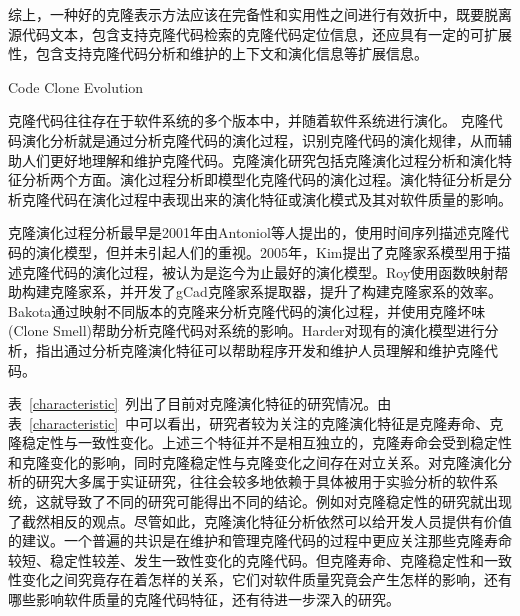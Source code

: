 综上，一种好的克隆表示方法应该在完备性和实用性之间进行有效折中，既要脱离源代码文本，包含支持克隆代码检索的克隆代码定位信息，还应具有一定的可扩展性，包含支持克隆代码分析和维护的上下文和演化信息等扩展信息。

{Code Clone Evolution}
\label{ref-evolution}

克隆代码往往存在于软件系统的多个版本中，并随着软件系统进行演化。
克隆代码演化分析就是通过分析克隆代码的演化过程，识别克隆代码的演化规律，从而辅助人们更好地理解和维护克隆代码。克隆演化研究包括克隆演化过程分析和演化特征分析两个方面。演化过程分析即模型化克隆代码的演化过程。演化特征分析是分析克隆代码在演化过程中表现出来的演化特征或演化模式及其对软件质量的影响。

克隆演化过程分析最早是2001年由Antoniol等人提出的，使用时间序列描述克隆代码的演化模型\cite{antoniol2001modeling}，但并未引起人们的重视。2005年，Kim提出了克隆家系模型用于描述克隆代码的演化过程，被认为是迄今为止最好的演化模型\cite{kim2005empirical}。Roy使用函数映射帮助构建克隆家系，并开发了gCad克隆家系提取器，提升了构建克隆家系的效率\cite{saha2011automatic}。Bakota通过映射不同版本的克隆来分析克隆代码的演化过程，并使用克隆坏味(Clone Smell)帮助分析克隆代码对系统的影响\cite{bakota2011tracking}。Harder对现有的演化模型进行分析\cite{harder2009modeling}，指出通过分析克隆演化特征可以帮助程序开发和维护人员理解和维护克隆代码。

表~\ref{characteristic}~列出了目前对克隆演化特征的研究情况。由表~\ref{characteristic}~中可以看出，研究者较为关注的克隆演化特征是克隆寿命、克隆稳定性与一致性变化。上述三个特征并不是相互独立的，克隆寿命会受到稳定性和克隆变化的影响，同时克隆稳定性与克隆变化之间存在对立关系。对克隆演化分析的研究大多属于实证研究，往往会较多地依赖于具体被用于实验分析的软件系统，这就导致了不同的研究可能得出不同的结论。例如对克隆稳定性的研究就出现了截然相反的观点。尽管如此，克隆演化特征分析依然可以给开发人员提供有价值的建议。一个普遍的共识是在维护和管理克隆代码的过程中更应关注那些克隆寿命较短、稳定性较差、发生一致性变化的克隆代码。但克隆寿命、克隆稳定性和一致性变化之间究竟存在着怎样的关系，它们对软件质量究竟会产生怎样的影响，还有哪些影响软件质量的克隆代码特征，还有待进一步深入的研究。

